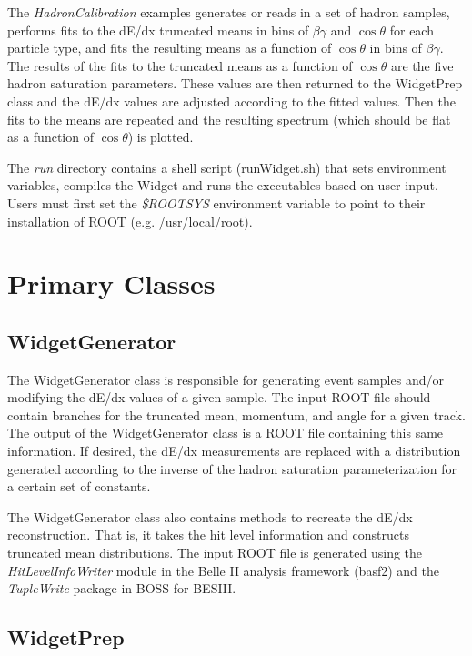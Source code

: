 \documentclass{article}
\begin{document}
The \textit{HadronCalibration} examples generates or reads in a set of hadron samples, performs 
fits to the dE/dx truncated means in bins of $\beta\gamma$ and $\cos{\theta}$ for each particle 
type, and fits the resulting means as a function of $\cos{\theta}$ in bins of $\beta\gamma$.
The results of the fits to the truncated means as a function of $\cos{\theta}$ are the five 
hadron saturation parameters. These values are then returned to the WidgetPrep class and
the dE/dx values are adjusted according to the fitted values. Then the fits to the means are 
repeated and the resulting spectrum (which should be flat as a function of $\cos{\theta}$) 
is plotted.

The \textit{run} directory contains a shell script (runWidget.sh) that sets environment 
variables, compiles the Widget and runs the executables based on user input. Users must first 
set the \textit{\$ROOTSYS} environment variable to point to their installation of ROOT 
(e.g. /usr/local/root).

\section{Primary Classes}

\subsection{WidgetGenerator}

The WidgetGenerator class is responsible for generating event samples and/or modifying the dE/dx
values of a given sample. The input ROOT file should contain branches for the truncated mean,
momentum, and angle for a given track. The output of the WidgetGenerator class is a ROOT file 
containing this same information. If desired, the dE/dx measurements are replaced with a
distribution generated according to the inverse of the hadron saturation parameterization for a 
certain set of constants.

The WidgetGenerator class also contains methods to recreate the dE/dx reconstruction. That is,
it takes the hit level information and constructs truncated mean distributions. The input ROOT
file is generated using the \textit{HitLevelInfoWriter} module in the Belle II analysis 
framework (basf2) and the \textit{TupleWrite} package in BOSS for BESIII.

\subsection{WidgetPrep}
\end{document}
